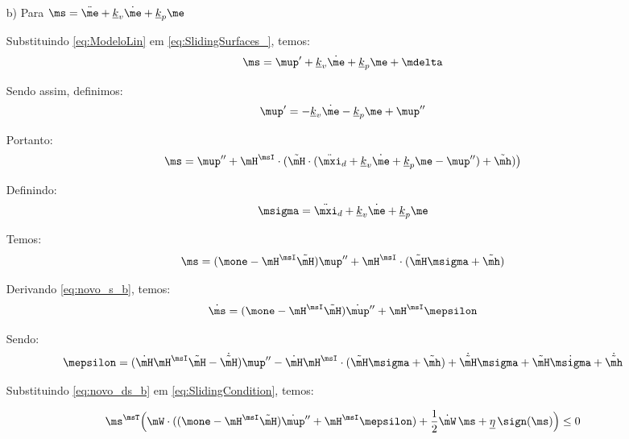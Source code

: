 \documentclass[]{politex}
\begin{document}
\begin{itemize}
\item[b)] Para $\ms = \ddot{\me} + \underline{k}_v \dot{\me} + \underline{k}_p \me  $

Substituindo \eqref{eq:ModeloLin} em \eqref{eq:SlidingSurfaces_}, temos:
\begin{equation}
\ms = \mup' + \underline{k}_v \dot{\me} + \underline{k}_p \me + \mdelta
\end{equation}

Sendo assim, definimos:
\begin{equation}
\mup' = -\underline{k}_v \dot{\me} - \underline{k}_p \me + \mup''
\end{equation}

Portanto:
\begin{equation}
\ms = \mup'' + \mH^\msI \cdot ( \tilde{\mH} \cdot (\ddot{\mxi}_d + \underline{k}_v \dot{\me} + \underline{k}_p \me - \mup'') + \tilde{\mh} ) \big)
\end{equation}

Definindo:
\begin{equation}
\msigma = \ddot{\mxi}_d + \underline{k}_v \dot{\me} + \underline{k}_p \me
\end{equation}

Temos:
\begin{equation} \label{eq:novo_s_b}
\ms = (\mone - \mH^\msI \tilde{\mH} )\mup'' + \mH^\msI \cdot ( \tilde{\mH}\msigma + \tilde{\mh} )
\end{equation}

Derivando \eqref{eq:novo_s_b}, temos:
\begin{equation} \label{eq:novo_ds_b}
\dot{\ms} = (\mone - \mH^\msI \tilde{\mH} )\dot{\mup}'' + \mH^\msI \mepsilon
\end{equation}

Sendo:
\begin{equation}
\mepsilon = ( \dot{\mH} \mH^\msI \tilde{\mH} -\dot{\tilde{\mH}}) \mup'' -  \dot{\mH} \mH^\msI \cdot ( \tilde{\mH}\msigma + \tilde{\mh} ) +  \dot{\tilde{\mH}}\msigma + \tilde{\mH} \dot{\msigma} + \dot{\tilde{\mh}}
\end{equation}


Substituindo \eqref{eq:novo_ds_b} em \eqref{eq:SlidingCondition}, temos:

\begin{equation} \label{eq:SlidingCondition2b}
\ms^\msT \Big(\mW \cdot ( (\mone - \mH^\msI \tilde{\mH} )\dot{\mup}'' + \mH^\msI \mepsilon ) + \frac{1}{2}\dot{\mW} \, \ms + \underline{\eta} \, \sign(\ms) \Big) \leq 0
\end{equation} \\



\end{itemize}
\end{document}
